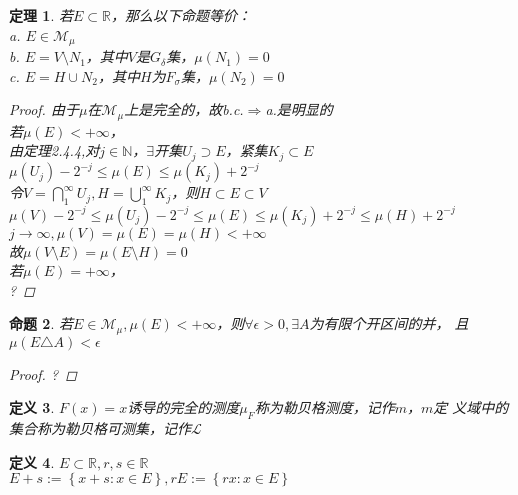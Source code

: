 \documentclass[12pt, a4paper, oneside]{ctexbook}
\newtheorem{theorem}{定理}[section]
\newtheorem{definition}[theorem]{定义}
\newtheorem{proposition}[theorem]{命题}
\begin{document}
\begin{theorem}
    若$E\subset\mathbb{R}$，那么以下命题等价：\\
    a. $E\in\mathcal{M}_{\mu}$\\
    b. $E=V\setminus N_1$，其中$V$是$G_{\delta}$集，$\mu(N_1)=0$\\
    c. $E=H\cup N_2$，其中$H$为$F_{\sigma}$集，$\mu(N_2)=0$
    \begin{proof}
        由于$\mu$在$\mathcal{M}_{\mu}$上是完全的，故b.c.$\Rightarrow$a.是明显的\\
        若$\mu(E)<+\infty$，\\
        由定理2.4.4,对$j\in\mathbb{N}$，$\exists$开集$U_j\supset E$，紧集$K_j\subset E$\\
        $\mu(U_j)-2^{-j}\leq\mu(E)\leq\mu(K_j)+2^{-j}$\\
        令$V=\bigcap_1^{\infty}U_j,H=\bigcup_1^{\infty}K_j$，则$H\subset E\subset V$\\
        $\mu(V)-2^{-j}\leq\mu(U_j)-2^{-j}\leq\mu(E)\leq\mu(K_j)+2^{-j}\leq\mu(H)+2^{-j}$\\
        $j\to\infty,\mu(V)=\mu(E)=\mu(H)<+\infty$\\
        故$\mu(V\setminus E)=\mu(E\setminus H)=0$\\
        若$\mu(E)=+\infty$，\\
        ?
    \end{proof}
\end{theorem}
\begin{proposition}
    若$E\in\mathcal{M}_{\mu},\mu(E)<+\infty$，则$\forall\epsilon>0,\exists A$为有限个开区间的并，
    且$\mu(E\triangle A)<\epsilon$
    \begin{proof}
        ?
    \end{proof}
\end{proposition}
\begin{definition}
    $F(x)=x$诱导的完全的测度$\mu_{F}$称为勒贝格测度，记作$m$，$m$定
    义域中的集合称为勒贝格可测集，记作$\mathcal{L}$
\end{definition}
\begin{definition}
    $E\subset\mathbb{R},r,s\in\mathbb{R}$\\
    $E+s:=\left\{x+s:x\in E\right\},rE:=\left\{rx:x\in E\right\}$
\end{definition}
\end{document}
